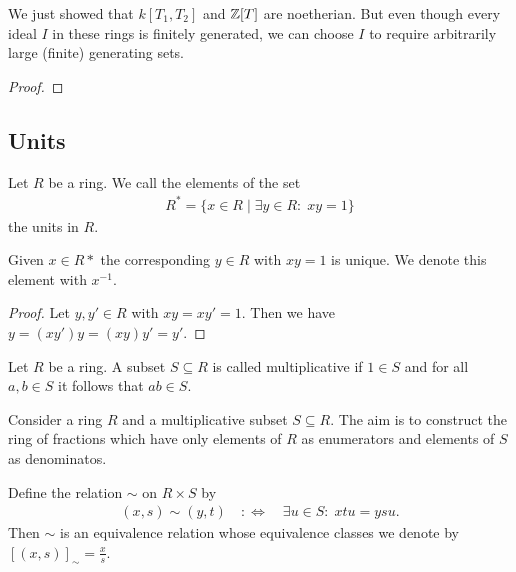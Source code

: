 \documentclass[../notes.tex]{subfiles}
\begin{document}
\begin{rem}{}{}
  We just showed that $k[T_1, T_2]$ and ${\mathbb{Z}}[T]$ are noetherian. But even though
  every ideal $I$ in these rings is finitely generated, we can choose
  $I$ to require arbitrarily large (finite) generating sets.
\end{rem}

\begin{proof}
  
\end{proof}

\subsection{Units}

\begin{defi}{}{}
  Let $R$ be a ring. We call the elements of the set
  \begin{align*}
    R^* = \{x \in R \mid \exists y \in R: \; xy = 1\}
  \end{align*}
  the units in $R$.
\end{defi}

\smallskip

\begin{rem}{}{}
  Given $x \in R*$ the corresponding $y \in R$ with $xy = 1$ is unique.
  We denote this element with $x^{-1}$.
\end{rem}

\begin{proof}
  Let $y,y' \in R$ with $xy = xy' = 1$. Then we have $y = (xy')y = (xy)y' = y'$.
\end{proof}

\smallskip

\begin{defi}{}{}
  Let $R$ be a ring. A subset $S \subseteq R$ is called multiplicative if $1 \in S$
  and for all $a,b \in S$ it follows that $ab \in S$.
\end{defi}

\smallskip
\noindent Consider a ring $R$ and a multiplicative subset $S \subseteq R$.
The aim is to construct the ring of fractions which have only elements of $R$ as
enumerators and elements of $S$ as denominatos.

\smallskip
\begin{lemm}{}{}
  Define the relation $\sim$ on $R \times S$ by
  \begin{align*}
    (x,s) \sim (y,t) \quad :\Leftrightarrow \quad \exists u \in S: \; xtu = ysu.
  \end{align*}
  Then $\sim$ is an equivalence relation whose equivalence classes we denote by
  $[(x,s)]_{\sim} = \frac{x}{s}$.
\end{lemm}
\end{document}
